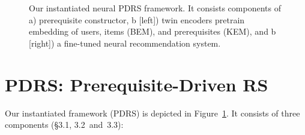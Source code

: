 \begin{figure}[t] 
    \setlength{\abovecaptionskip}{-0cm}
    \setlength{\belowcaptionskip}{-0.5cm}
	\subfigtopskip=2pt 
	\subfigbottomskip=2pt 
	\subfigcapskip=-5pt
	\caption{Our instantiated neural PDRS framework. It consists components of a) prerequisite constructor,  b [left]) twin encoders pretrain embedding of users, items (BEM), and prerequisites (KEM), and b [right]) a fine-tuned neural recommendation system.}
	\label{fig:framework}
\end{figure}

\section{PDRS: Prerequisite-Driven RS}
Our instantiated framework (PDRS) is depicted in Figure~\ref{fig:framework}.  It consists of three components (\S 3.1, 3.2~and~3.3):


